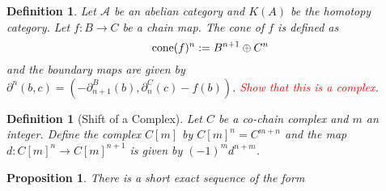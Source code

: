 \documentclass{amsart}
\theoremstyle{thmstyle}
\newtheorem{proposition}[theorem]{Proposition}
\theoremstyle{defstyle}
\newtheorem{definition}[theorem]{Definition}
\begin{document}
\begin{definition}
    Let $\mathcal A$ be an abelian category and $K(A)$ be the \emph{homotopy category}. Let $f: B\to C$ be a chain map. The \emph{cone of $f$} is defined as 
    \begin{equation*}
        \operatorname{cone}(f)^n := B^{n + 1}\oplus C^n
    \end{equation*}
    and the boundary maps are given by $\partial^n(b,c) = \left(-\partial_{n + 1}^B(b), \partial_n^C(c) - f(b)\right)$. \textcolor{red}{Show that this is a complex}.
\end{definition}

\begin{definition}[Shift of a Complex]
    Let $C$ be a co-chain complex and $m$ an integer. Define the complex $C[m]$ by $C[m]^n = C^{m + n}$ and the map $d: C[m]^n\to C[m]^{n + 1}$ is given by $(-1)^md^{n + m}$.
\end{definition}

\begin{proposition}
    There is a short exact sequence of the form 
\end{proposition}
\end{document}
